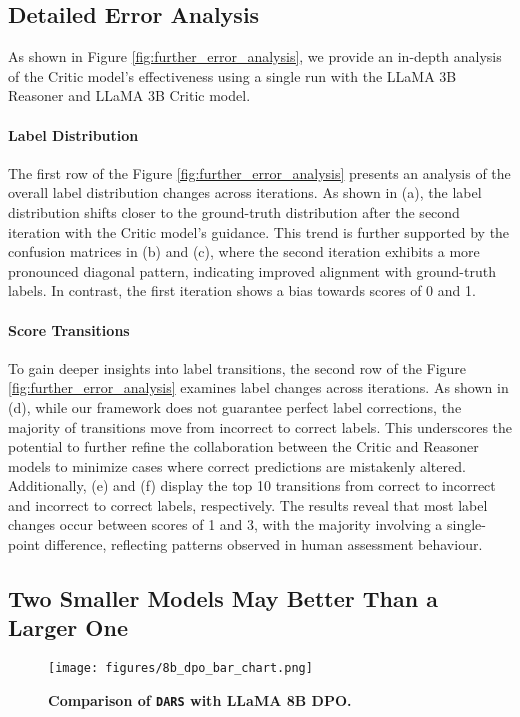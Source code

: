 \subsection{Detailed Error Analysis}  \label{sec:our_detail_error_analysis}

As shown in Figure \ref{fig:further_error_analysis}, we provide an in-depth analysis of the Critic model's effectiveness using a single run with the LLaMA 3B Reasoner and LLaMA 3B Critic model.

\paragraph{Label Distribution} The first row of the Figure \ref{fig:further_error_analysis} presents an analysis of the overall label distribution changes across iterations. As shown in (a), the label distribution shifts closer to the ground-truth distribution after the second iteration with the Critic model's guidance. This trend is further supported by the confusion matrices in (b) and (c), where the second iteration exhibits a more pronounced diagonal pattern, indicating improved alignment with ground-truth labels. In contrast, the first iteration shows a bias towards scores of 0 and 1.

\paragraph{Score Transitions} To gain deeper insights into label transitions, the second row of the Figure \ref{fig:further_error_analysis} examines label changes across iterations. As shown in (d), while our framework does not guarantee perfect label corrections, the majority of transitions move from incorrect to correct labels. This underscores the potential to further refine the collaboration between the Critic and Reasoner models to minimize cases where correct predictions are mistakenly altered. Additionally, (e) and (f) display the top 10 transitions from correct to incorrect and incorrect to correct labels, respectively. The results reveal that most label changes occur between scores of 1 and 3, with the majority involving a single-point difference, reflecting patterns observed in human assessment behaviour.

\subsection{Two Smaller Models May Better Than a Larger One}
\begin{figure}[ht]
\centering
\texttt{[image: figures/8b\_dpo\_bar\_chart.png]}
\caption{\textbf{Comparison of \texttt{DARS} with LLaMA 8B DPO.}}
\label{fig:llama8b_dpo}
\end{figure}

